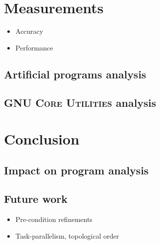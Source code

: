 \documentclass[12pt,oneside]{fithesis2}
\theoremstyle{definition}
\begin{document}
\chapter{Measurements}
\begin{itemize}
  \item Accuracy
  \item Performance
\end{itemize}
\section{Artificial programs analysis}
\section{\textsc{GNU Core Utilities} analysis}


\chapter{Conclusion}
\section{Impact on program analysis}
\section{Future work}
\begin{itemize}
  \item Pre-condition refinements
  \item Task-parallelism, topological order
\end{itemize}



\end{document}
